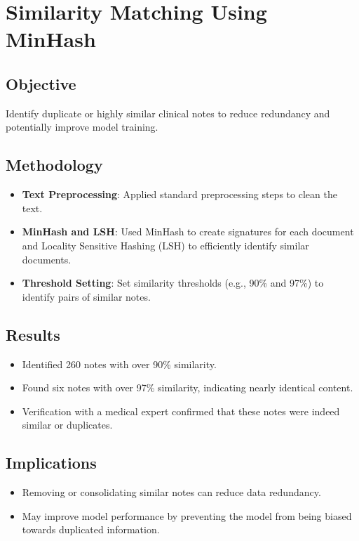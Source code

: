 \documentclass[12pt,a4paper]{report}
\begin{document}
\section{Similarity Matching Using MinHash}

\subsection{Objective}
Identify duplicate or highly similar clinical notes to reduce redundancy and potentially improve model training.

\subsection{Methodology}
\begin{itemize}
    \item \textbf{Text Preprocessing}: Applied standard preprocessing steps to clean the text.
    \item \textbf{MinHash and LSH}: Used MinHash to create signatures for each document and Locality Sensitive Hashing (LSH) to efficiently identify similar documents.
    \item \textbf{Threshold Setting}: Set similarity thresholds (e.g., 90\% and 97\%) to identify pairs of similar notes.
\end{itemize}

\subsection{Results}
\begin{itemize}
    \item Identified 260 notes with over 90\% similarity.
    \item Found six notes with over 97\% similarity, indicating nearly identical content.
    \item Verification with a medical expert confirmed that these notes were indeed similar or duplicates.
\end{itemize}

\subsection{Implications}
\begin{itemize}
    \item Removing or consolidating similar notes can reduce data redundancy.
    \item May improve model performance by preventing the model from being biased towards duplicated information.
\end{itemize}
\end{document}
